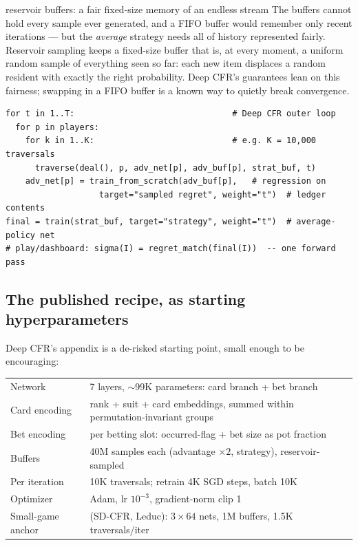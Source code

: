 \begin{intuition}{reservoir buffers: a fair fixed-size memory of an endless stream}
The buffers cannot hold every sample ever generated, and a FIFO buffer would remember only recent iterations --- but the \emph{average} strategy needs all of history represented fairly. Reservoir sampling keeps a fixed-size buffer that is, at every moment, a uniform random sample of everything seen so far: each new item displaces a random resident with exactly the right probability. Deep CFR's guarantees lean on this fairness; swapping in a FIFO buffer is a known way to quietly break convergence.
\end{intuition}

\begin{lstlisting}
for t in 1..T:                                # Deep CFR outer loop
  for p in players:
    for k in 1..K:                            # e.g. K = 10,000 traversals
      traverse(deal(), p, adv_net[p], adv_buf[p], strat_buf, t)
    adv_net[p] = train_from_scratch(adv_buf[p],   # regression on
                   target="sampled regret", weight="t")  # ledger contents
final = train(strat_buf, target="strategy", weight="t")  # average-policy net
# play/dashboard: sigma(I) = regret_match(final(I))  -- one forward pass
\end{lstlisting}

\subsection*{The published recipe, as starting hyperparameters}

Deep CFR's appendix is a de-risked starting point, small enough to be encouraging:

\begin{center}
\footnotesize
\begin{tabular}{@{}ll@{}}
\toprule
Network & 7 layers, $\sim$99K parameters: card branch + bet branch \\
Card encoding & rank + suit + card embeddings, summed within permutation-invariant groups \\
Bet encoding & per betting slot: occurred-flag + bet size as pot fraction \\
Buffers & 40M samples each (advantage $\times2$, strategy), reservoir-sampled \\
Per iteration & 10K traversals; retrain 4K SGD steps, batch 10K \\
Optimizer & Adam, lr $10^{-3}$, gradient-norm clip 1 \\
Small-game anchor & (SD-CFR, Leduc): $3\times64$ nets, 1M buffers, 1.5K traversals/iter \\
\bottomrule
\end{tabular}
\end{center}

